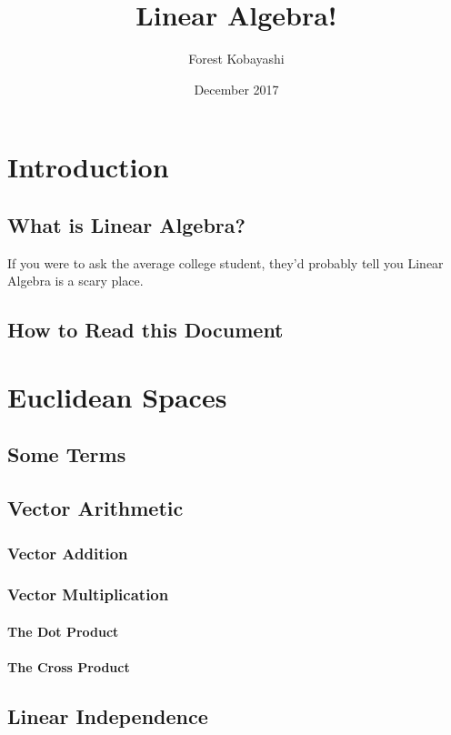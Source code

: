 \documentclass[cm, 10pt, titlepage, oneside]{book}
\title{\bf Linear Algebra!}
\date{December 2017}
\author{Forest Kobayashi}
\begin{document}

\frontmatter
\maketitle
\tableofcontents
\mainmatter


\chapter{Introduction}
  \section{What is Linear Algebra?}
    If you were to ask the average college student, they'd probably
    tell you Linear Algebra is a scary place.
  \section{How to Read this Document}

\chapter{Euclidean Spaces}
  \section{Some Terms}
  \section{Vector Arithmetic}
    \subsection{Vector Addition}
    \subsection{Vector Multiplication}
      \subsubsection{The Dot Product}
      \subsubsection{The Cross Product}
  \section{Linear Independence}
\end{document}

